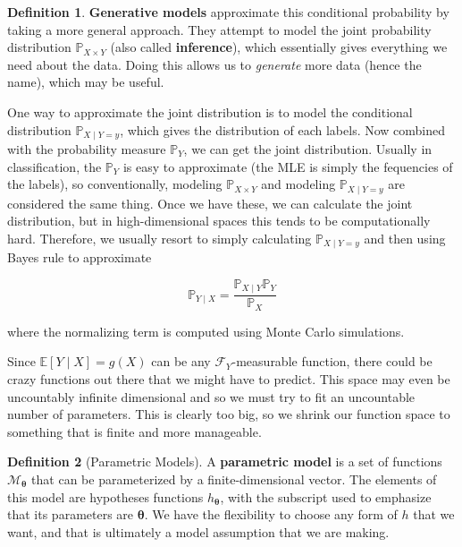 \documentclass{article}
\theoremstyle{definition}
\newtheorem{definition}{Definition}[section]
\begin{document}
    \begin{definition}
      \textbf{Generative models} approximate this conditional probability by taking a more general approach. They attempt to model the joint probability distribution $\mathbb{P}_{X \times Y}$ (also called \textbf{inference}), which essentially gives everything we need about the data. Doing this allows us to \textit{generate} more data (hence the name), which may be useful. 
          
      One way to approximate the joint distribution is to model the conditional distribution $\mathbb{P}_{X \mid Y = y}$, which gives the distribution of each labels. Now combined with the probability measure $\mathbb{P}_Y$, we can get the joint distribution. Usually in classification, the $\mathbb{P}_Y$ is easy to approximate (the MLE is simply the fequencies of the labels), so conventionally, modeling $\mathbb{P}_{X \times Y}$ and modeling $\mathbb{P}_{X \mid Y = y}$ are considered the same thing. Once we have these, we can calculate the joint distribution, but in high-dimensional spaces this tends to be computationally hard. Therefore, we usually resort to simply calculating $\mathbb{P}_{X \mid Y = y}$ and then using Bayes rule to approximate 

        \[\mathbb{P}_{Y \mid X} = \frac{\mathbb{P}_{X \mid Y} \mathbb{P}_Y}{\mathbb{P}_X}\]

      where the normalizing term is computed using Monte Carlo simulations. 
    \end{definition}

    Since $\mathbb{E}[Y \mid X] = g(X)$ can be any $\mathcal{F}_Y$-measurable function, there could be crazy functions out there that we might have to predict. This space may even be uncountably infinite dimensional and so we must try to fit an uncountable number of parameters. This is clearly too big, so we shrink our function space to something that is finite and more manageable. 

    \begin{definition}[Parametric Models]
      A \textbf{parametric model} is a set of functions $\mathcal{M}_{\boldsymbol{\theta}}$ that can be parameterized by a finite-dimensional vector. The elements of this model are hypotheses functions $h_{\boldsymbol{\theta}}$, with the subscript used to emphasize that its parameters are $\boldsymbol{\theta}$. We have the flexibility to choose any form of $h$ that we want, and that is ultimately a model assumption that we are making. 
    \end{definition}
\end{document}
